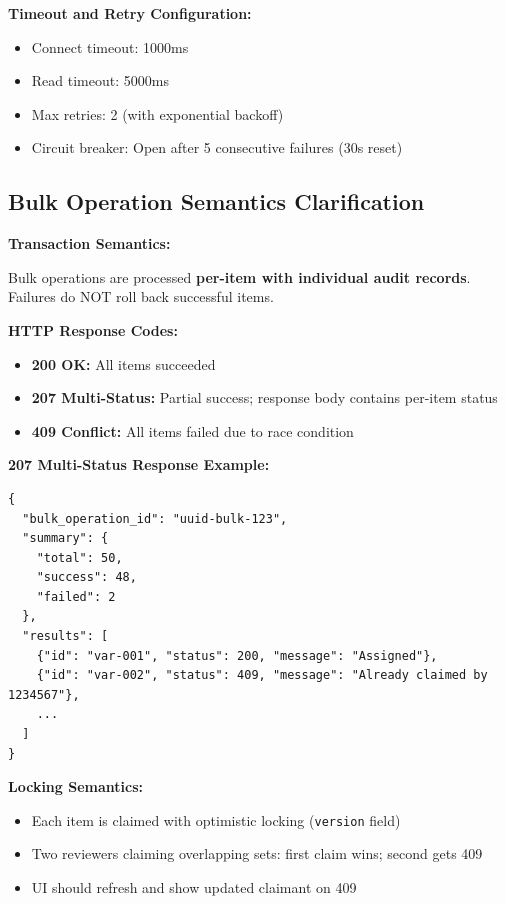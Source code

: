 \begin{tcolorbox}[colback=blue!5,colframe=blue!70,title=LLM Service Contract: vLLM Commentary Generation]
\textbf{Timeout and Retry Configuration:}
\begin{itemize}
    \item Connect timeout: 1000ms
    \item Read timeout: 5000ms
    \item Max retries: 2 (with exponential backoff)
    \item Circuit breaker: Open after 5 consecutive failures (30s reset)
\end{itemize}
\end{tcolorbox}

\subsection{Bulk Operation Semantics Clarification}
\label{sec:bulk-semantics}

\begin{tcolorbox}[colback=green!5,colframe=green!70,title=Bulk Operation Specification]

\textbf{Transaction Semantics:}

Bulk operations are processed \textbf{per-item with individual audit records}. 
Failures do NOT roll back successful items.

\textbf{HTTP Response Codes:}
\begin{itemize}
    \item \textbf{200 OK:} All items succeeded
    \item \textbf{207 Multi-Status:} Partial success; response body contains per-item status
    \item \textbf{409 Conflict:} All items failed due to race condition
\end{itemize}

\textbf{207 Multi-Status Response Example:}
\begin{lstlisting}[language=jsonx]
{
  "bulk_operation_id": "uuid-bulk-123",
  "summary": {
    "total": 50,
    "success": 48,
    "failed": 2
  },
  "results": [
    {"id": "var-001", "status": 200, "message": "Assigned"},
    {"id": "var-002", "status": 409, "message": "Already claimed by 1234567"},
    ...
  ]
}
\end{lstlisting}

\textbf{Locking Semantics:}
\begin{itemize}
    \item Each item is claimed with optimistic locking (\texttt{version} field)
    \item Two reviewers claiming overlapping sets: first claim wins; second gets 409
    \item UI should refresh and show updated claimant on 409
\end{itemize}
\end{tcolorbox}

